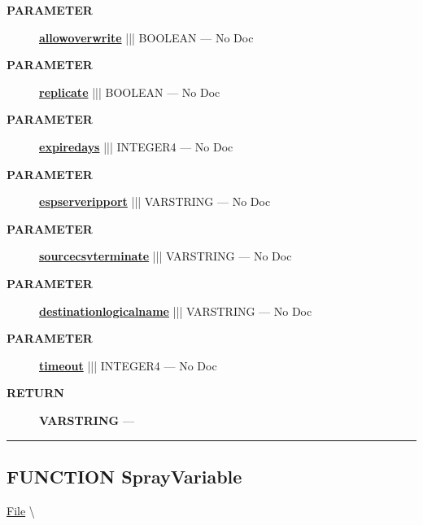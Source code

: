 \begin{description}
\item [\colorbox{tagtype}{\color{white} \textbf{\textsf{PARAMETER}}}] \textbf{\underline{allowoverwrite}} ||| BOOLEAN --- No Doc
\item [\colorbox{tagtype}{\color{white} \textbf{\textsf{PARAMETER}}}] \textbf{\underline{replicate}} ||| BOOLEAN --- No Doc
\item [\colorbox{tagtype}{\color{white} \textbf{\textsf{PARAMETER}}}] \textbf{\underline{expiredays}} ||| INTEGER4 --- No Doc
\item [\colorbox{tagtype}{\color{white} \textbf{\textsf{PARAMETER}}}] \textbf{\underline{espserveripport}} ||| VARSTRING --- No Doc
\item [\colorbox{tagtype}{\color{white} \textbf{\textsf{PARAMETER}}}] \textbf{\underline{sourcecsvterminate}} ||| VARSTRING --- No Doc
\item [\colorbox{tagtype}{\color{white} \textbf{\textsf{PARAMETER}}}] \textbf{\underline{destinationlogicalname}} ||| VARSTRING --- No Doc
\item [\colorbox{tagtype}{\color{white} \textbf{\textsf{PARAMETER}}}] \textbf{\underline{timeout}} ||| INTEGER4 --- No Doc
\end{description}







\par
\begin{description}
\item [\colorbox{tagtype}{\color{white} \textbf{\textsf{RETURN}}}] \textbf{VARSTRING} --- 
\end{description}




\rule{\linewidth}{0.5pt}
\subsection*{\textsf{\colorbox{headtoc}{\color{white} FUNCTION}
SprayVariable}}

\hypertarget{ecldoc:file.sprayvariable}{}
\hspace{0pt} \hyperlink{ecldoc:File}{File} \textbackslash 

